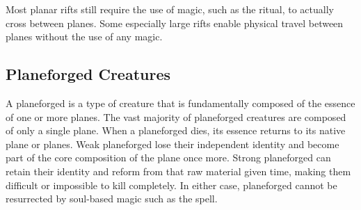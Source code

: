    Most planar rifts still require the use of magic, such as the  ritual, to actually cross between planes.
    Some especially large rifts enable physical travel between planes without the use of any magic.

  \subsection{Planeforged Creatures}
    A planeforged is a type of creature that is fundamentally composed of the essence of one or more planes.
    The vast majority of planeforged creatures are composed of only a single plane.
    When a planeforged dies, its essence returns to its native plane or planes.
    Weak planeforged lose their independent identity and become part of the core composition of the plane once more.
    Strong planeforged can retain their identity and reform from that raw material given time, making them difficult or impossible to kill completely.
    In either case, planeforged cannot be resurrected by soul-based magic such as the  spell.

